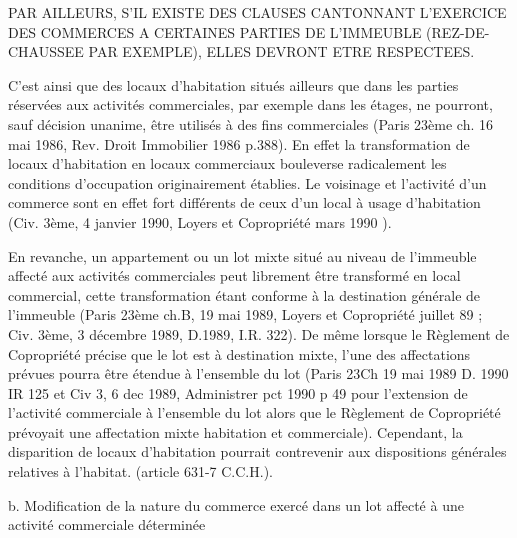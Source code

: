 				PAR AILLEURS, S'IL EXISTE DES CLAUSES CANTONNANT L'EXERCICE DES COMMERCES A CERTAINES PARTIES DE L'IMMEUBLE (REZ-DE-CHAUSSEE PAR EXEMPLE), ELLES DEVRONT ETRE RESPECTEES.
				
				C'est ainsi que des locaux d'habitation situés ailleurs que dans les parties réservées aux activités commerciales, par exemple dans les étages, ne pourront, sauf décision unanime, être utilisés à des fins commerciales (Paris 23ème ch. 16 mai 1986, Rev. Droit Immobilier 1986 p.388).
				En effet la transformation de locaux d'habitation en locaux commerciaux bouleverse radicalement les conditions d'occupation originairement établies. Le voisinage et l'activité d'un commerce sont en effet fort différents de ceux d'un local à usage d'habitation (Civ. 3ème, 4 janvier 1990, Loyers et Copropriété mars 1990 ).
	
				En revanche, un appartement ou un lot mixte situé au niveau de l'immeuble affecté aux activités commerciales peut librement être transformé en local commercial, cette transformation étant conforme à la destination générale de l'immeuble (Paris 23ème ch.B, 19 mai 1989, Loyers et Copropriété juillet 89 ; Civ. 3ème, 3 décembre 1989, D.1989, I.R. 322).
				De même lorsque le Règlement de Copropriété précise que le lot est à destination mixte, l'une des affectations prévues pourra être étendue à l'ensemble du lot (Paris 23\degres Ch 19 mai 1989 D. 1990 IR 125 et Civ 3\degres, 6 dec 1989, Administrer pct 1990 p 49 pour l'extension de l'activité commerciale à l'ensemble du lot alors que le Règlement de Copropriété prévoyait une affectation mixte habitation et commerciale).
				Cependant, la disparition de locaux d'habitation pourrait contrevenir aux dispositions générales relatives à l'habitat. (article 631-7 C.C.H.).
			
			b. Modification de la nature du commerce exercé dans un lot affecté à une activité commerciale déterminée
			
